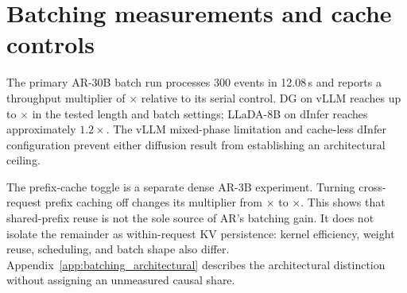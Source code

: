 \section{Batching measurements and cache controls}
\label{app:batching}

The primary AR-30B batch run processes 300 events in 12.08\,s and
reports a throughput multiplier of \arBatchMult$\times$ relative
to its serial control. DG on vLLM reaches up to
\dgBatchVllmHi$\times$ in the tested length and batch settings;
LLaDA-8B on dInfer reaches approximately $1.2\times$.
The vLLM mixed-phase limitation and cache-less dInfer configuration
prevent either diffusion result from establishing an architectural ceiling.

The prefix-cache toggle is a separate dense AR-3B experiment. Turning
cross-request prefix caching off changes its multiplier from
\cacheOnMult$\times$ to \cacheOffMult$\times$.
This shows that shared-prefix reuse is not the sole source of AR's
batching gain. It does not isolate the remainder as within-request KV
persistence: kernel efficiency, weight reuse, scheduling, and batch shape
also differ. Appendix~\ref{app:batching_architectural} describes the
architectural distinction without assigning an unmeasured causal share.
